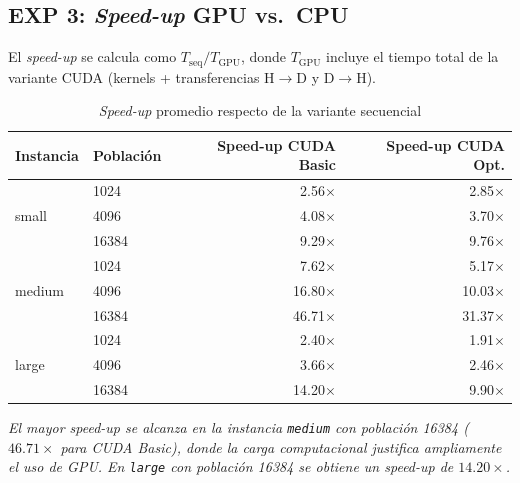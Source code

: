 \subsection{EXP 3: \emph{Speed-up} GPU vs.\ CPU}

El \emph{speed-up} se calcula como $T_{\text{seq}} / T_{\text{GPU}}$, donde
$T_{\text{GPU}}$ incluye el tiempo total de la variante CUDA (kernels +
transferencias H$\to$D y D$\to$H).

\begin{table}[H]
  \centering
  \caption{\emph{Speed-up} promedio respecto de la variante secuencial}
  \label{tab:exp3}
  \begin{tabular}{llrr}
    \toprule
    \textbf{Instancia} & \textbf{Población} &
    \textbf{Speed-up CUDA Basic} & \textbf{Speed-up CUDA Opt.} \\
    \midrule
    \multirow{3}{*}{small}
        & 1024  & 2.56$\times$ & 2.85$\times$ \\
        & 4096 & 4.08$\times$ & 3.70$\times$ \\
        & 16384 & 9.29$\times$ & 9.76$\times$ \\
    \midrule
    \multirow{3}{*}{medium}
        & 1024  & 7.62$\times$ & 5.17$\times$ \\
        & 4096 & 16.80$\times$ & 10.03$\times$ \\
        & 16384 & 46.71$\times$ & 31.37$\times$ \\
    \midrule
    \multirow{3}{*}{large}
        & 1024  & 2.40$\times$ & 1.91$\times$ \\
        & 4096 & 3.66$\times$ & 2.46$\times$ \\
        & 16384 & 14.20$\times$ & 9.90$\times$ \\
    \bottomrule
  \end{tabular}
\end{table}
\noindent\textit{El mayor speed-up se alcanza en la instancia \texttt{medium}
con población 16384 ($46.71\times$ para CUDA Basic), donde la carga
computacional justifica ampliamente el uso de GPU. En \texttt{large} con
población 16384 se obtiene un speed-up de $14.20\times$.}

